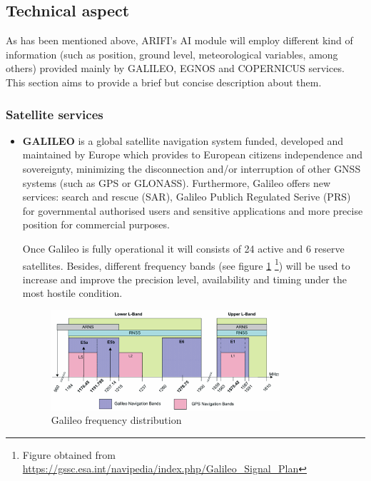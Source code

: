 
\newpage
\subsection{Technical aspect}
\color{blue} As has been mentioned above, ARIFI's AI module will employ different kind of information (such as position, ground level, meteorological variables, among others) provided mainly by GALILEO, EGNOS and COPERNICUS services. This section aims to provide a brief but concise description about them. 
\color{black} 

\subsubsection{Satellite services}
\begin{itemize}
    \item \textbf{GALILEO} \color{blue} is a global satellite navigation system funded, developed and maintained by Europe which provides to European citizens independence and sovereignty, minimizing the disconnection and/or interruption of other GNSS systems (such as GPS or GLONASS). Furthermore, Galileo offers new services: search and rescue (SAR), Galileo Publich Regulated Serive (PRS) for governmental authorised users and sensitive applications and more precise position for commercial purposes.   
    
    Once Galileo is fully operational it will consists of 24 active and 6 reserve satellites. Besides, different frequency bands (see figure \ref{fig:frequency_plan} \footnote{Figure obtained from \url{https://gssc.esa.int/navipedia/index.php/Galileo_Signal_Plan}}) will be used to increase and improve the precision level, availability and timing under the most hostile condition. 
    
    \begin{figure}
    	\centering
    	\includegraphics[width=0.8\textwidth]{images/Galileo_Frequency_Plan.png}
    	\caption{Galileo frequency distribution}
    	\label{fig:frequency_plan}
    \end{figure} 
    

\end{itemize}
